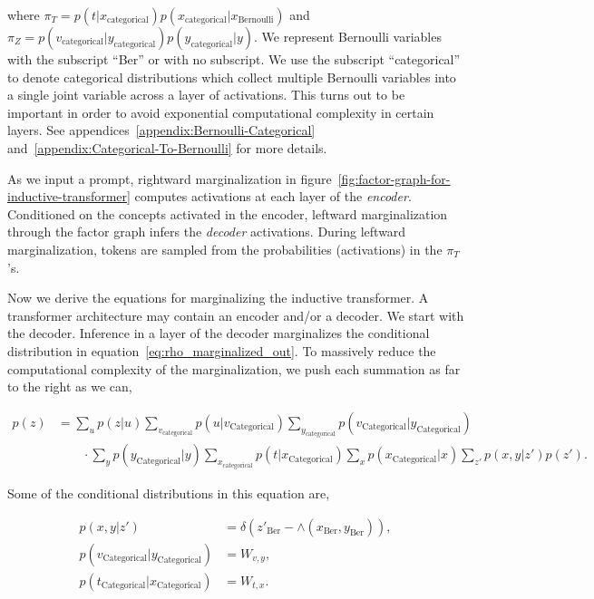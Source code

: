 \documentclass{article}
\begin{document}
where $\pi_T = p(t|x_{\text{categorical}})p(x_{\text{categorical}}|x_{\text{Bernoulli}})$ and $\pi_Z = p(v_{\text{categorical}}| y_{\text{categorical}})p(y_{\text{categorical}}|y)$.  We represent Bernoulli variables with the subscript ``Ber''  or with no subscript.  We use the subscript ``categorical'' to denote categorical distributions which collect multiple Bernoulli variables into a single joint variable across a layer of activations. This turns out to be important in order to avoid exponential computational complexity in certain layers.  See appendices~\ref{appendix:Bernoulli-Categorical} and~\ref{appendix:Categorical-To-Bernoulli} for more details.  

As we input a prompt, rightward marginalization in figure~\ref{fig:factor-graph-for-inductive-transformer} computes activations at each layer of the \emph{encoder}. Conditioned on the concepts activated in the encoder, leftward marginalization through the factor graph infers the \emph{decoder} activations.  During leftward marginalization, tokens are sampled from the probabilities (activations) in the $\pi_T$'s.  

Now we derive the equations for marginalizing the inductive transformer.  A transformer architecture may contain an encoder and/or a decoder.  We start with the decoder. Inference in a layer of the decoder marginalizes the conditional distribution in equation~\ref{eq:rho_marginalized_out}.  To massively reduce the computational complexity of the marginalization, we push each summation as far to the right as we can,

\begin{align}
p(z) &= \sum_u p(z|u)\sum_{v_\text{categorical}}p(u|v_{\text{Categorical}})\sum_{y_\text{categorical}}p(v_{\text{Categorical}}|y_{\text{Categorical}}) \nonumber \\ 
&\quad\quad \cdot \sum_y p(y_{\text{Categorical}}|y) \sum_{x_\text{categorical}} p(t|x_{\text{Categorical}})\sum_x p(x_{\text{Categorical}}|x) \sum_{z'}p(x, y|z')p(z').
\end{align}

Some of the conditional distributions in this equation are,

\begingroup
\addtolength{\jot}{1em}
\begin{align}
    p(x, y|z') &= \delta(z'_{\text{Ber}}-\land(x_{\text{Ber}}, y_{\text{Ber}})), \\
    p(v_{\text{Categorical}}|y_{\text{Categorical}}) &= W_{v,y}, \\
    p(t_{\text{Categorical}}|x_{\text{Categorical}}) &= W_{t,x}.
\end{align} 
\endgroup
\end{document}
